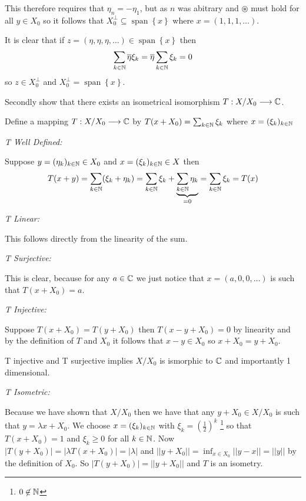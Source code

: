\documentclass{unswmaths}
\begin{document}
This therefore requires that $ \eta_n = -\eta_1 $, but as $ n $ was abitrary and $\circledast $ must hold for all $ y \in X_0 $ so it follows that $ X_0^\perp \subseteq \operatorname{span}\left\{ x\right\}$ where $ x = (1,1,1,\ldots) $.

It is clear that if $ z = (\eta, \eta, \eta, \ldots) \in \operatorname{span}\left\{ x \right\} $ then 
$$
	\sum_{k \in \mathbb{N}} \overline{\eta} \xi_k = \overline{\eta} \sum_{k \in \mathbb{N}} \xi_k = 0
$$
so $ z \in X_0^\perp $ and $ X_0^\perp = \operatorname{span}\left\{ x \right\} $.

Secondly show that there exists an isometrical isomorphism $ T : X/X_0 \longrightarrow \mathbb{C} $.

Define a mapping $ T : X/X_0 \longrightarrow \mathbb{C} $ by $ T(x + X_0) = \sum_{k \in \mathbb{N}}\xi_k $ where $ x = (\xi_k)_{k \in \mathbb{N}} $

\emph{T Well Defined: }

Suppose $ y = (\eta_k)_{k \in \mathbb{N}} \in X_0 $ and $ x = (\xi_k)_{k \in \mathbb{N}} \in X $ then 
$$ T(x +y) =  \sum_{k \in \mathbb{N}} (\xi_k + \eta_k) = \sum_{k \in \mathbb{N}} \xi_k + \underbrace{\sum_{k \in \mathbb{N}} \eta_k}_{=0} = \sum_{k \in \mathbb{N}} \xi_k = T(x) $$

\emph{T Linear: }

This follows directly from the linearity of the sum.

\emph{T Surjective: }

This is clear, because for any $ a \in \mathbb{C} $ we just notice that $ x = (a, 0, 0, \ldots ) $ is such that $ T(x + X_0) = a $.

\emph{T Injective: }

Suppose $ T(x + X_0) = T(y + X_0) $ then $ T(x -y  + X_0) = 0 $ by linearity and by the definition of $ T $ and $ X_0 $ it follows that $ x - y \in X_0 $ so $ x + X_0 = y + X_0 $.


T injective and T surjective implies $ X/X_0 $ is ismorphic to $ \mathbb{C} $ and importantly 1 dimensional.

\emph{T Isometric: }

Because we have shown that $ X/X_0 $ then we have that any $ y + X_0 \in X / X_0 $ is such that $ y = \lambda x + X_0 $. 
We choose $ x= (\xi_k )_{k \in \mathbb{N}} $ with $ \xi_k = \left(\frac{1}{2} \right)^k $ \footnote{ $ 0 \not\in \mathbb{N} $ } so that $ T(x + X_0) = 1 $ and $ \xi_k \geq 0 $ for all $ k \in \mathbb{N} $.
Now $ |T(y + X_0)| = |\lambda T(x+X_0)| = |\lambda| $ and $ ||y + X_0|| = \inf_{x \in X_0} ||y - x|| = ||y|| $ by the definition of $ X_0 $.
So $ |T(y + X_0)| = ||y + X_0 || $ and $ T $ is an isometry.
\end{document}
